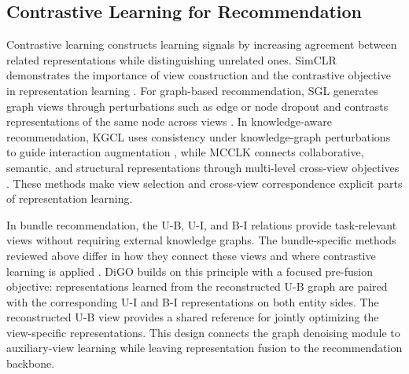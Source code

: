 \subsection{Contrastive Learning for Recommendation}

Contrastive learning constructs learning signals by increasing agreement between related representations while distinguishing unrelated ones. SimCLR demonstrates the importance of view construction and the contrastive objective in representation learning \cite{chen2020simclr}. For graph-based recommendation, SGL generates graph views through perturbations such as edge or node dropout and contrasts representations of the same node across views \cite{wu2021sgl}. In knowledge-aware recommendation, KGCL uses consistency under knowledge-graph perturbations to guide interaction augmentation \cite{yang2022kgcl}, while MCCLK connects collaborative, semantic, and structural representations through multi-level cross-view objectives \cite{zou2022mcclk}. These methods make view selection and cross-view correspondence explicit parts of representation learning.

In bundle recommendation, the U-B, U-I, and B-I relations provide task-relevant views without requiring external knowledge graphs. The bundle-specific methods reviewed above differ in how they connect these views and where contrastive learning is applied \cite{ma2022crosscbr,ma2024multicbr}. DiGO builds on this principle with a focused pre-fusion objective: representations learned from the reconstructed U-B graph are paired with the corresponding U-I and B-I representations on both entity sides. The reconstructed U-B view provides a shared reference for jointly optimizing the view-specific representations. This design connects the graph denoising module to auxiliary-view learning while leaving representation fusion to the recommendation backbone.
